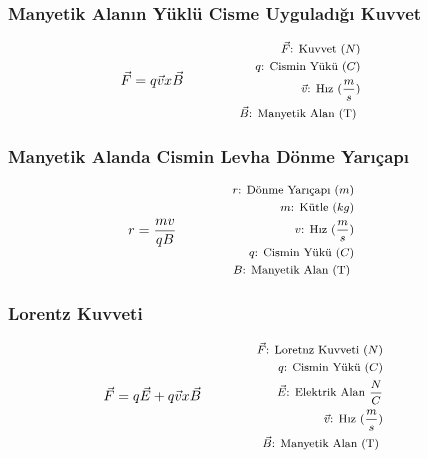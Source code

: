 \subsubsection*{Manyetik Alanın Yüklü Cisme Uyguladığı Kuvvet}
\begin{equation}
    \vec{F} = q \vec{v} x \vec{B} \qquad \qquad \parbox{4cm}{\footnotesize$\begin{aligned}
        \vec{F}\text{: Kuvvet } (N) \\
        q\text{: Cismin Yükü } (C) \\
        \vec{v}\text{: Hız } (\frac{m}{s}) \\
        \vec{B}\text{: Manyetik Alan (T) }
\end{aligned}$}
\end{equation}

\subsubsection*{Manyetik Alanda Cismin Levha Dönme Yarıçapı}
\begin{equation}
    r = \frac{m v}{q B} \qquad \qquad \parbox{4cm}{\footnotesize$\begin{aligned}
        r\text{: Dönme Yarıçapı } (m) \\
        m\text{: Kütle } (kg) \\
        v\text{: Hız } (\frac{m}{s}) \\
        q\text{: Cismin Yükü } (C) \\
        B\text{: Manyetik Alan (T) }
\end{aligned}$}
\end{equation}

\subsubsection*{Lorentz Kuvveti}
\begin{equation}
    \vec{F} = q \vec{E} + q \vec{v} x \vec{B} \qquad \qquad \parbox{4cm}{\footnotesize$\begin{aligned}
        \vec{F}\text{: Loretnz Kuvveti } (N) \\
        q\text{: Cismin Yükü } (C) \\
        \vec{E}\text{: Elektrik Alan } \frac{N}{C} \\
        \vec{v}\text{: Hız } (\frac{m}{s}) \\
        \vec{B}\text{: Manyetik Alan (T) }
\end{aligned}$}
\end{equation}
